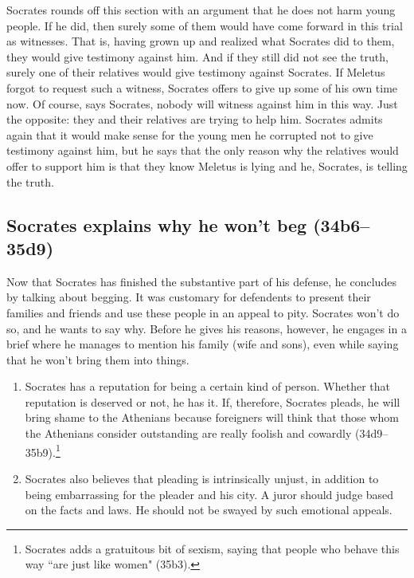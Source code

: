 \documentclass[11pt]{article}
\begin{document}
Socrates rounds off this section with an argument that he does not harm
young people.  If he did, then surely some of them would have come forward
in this trial as witnesses.  That is, having grown up and realized what
Socrates did to them, they would give testimony against him.  And if they
still did not see the truth, surely one of their relatives would give
testimony against Socrates.  If Meletus forgot to request such a witness,
Socrates offers to give up some of his own time now.  Of course, says
Socrates, nobody will witness against him in this way.  Just the opposite:
they and their relatives are trying to help him.  Socrates admits again
that it would make sense for the young men he corrupted not to give
testimony against him, but he says that the only reason why the relatives
would offer to support him is that they know Meletus is lying and he,
Socrates, is telling the truth.


\subsection{Socrates explains why he won't beg (34b6--35d9)}

Now that Socrates has finished the substantive part of his defense, he
concludes by talking about begging.  It was customary for defendents to
present their families and friends and use these people in an appeal to
pity.  Socrates won't do so, and he wants to say why.  Before he gives his
reasons, however, he engages in a brief  where he
manages to mention his family (wife and sons), even while saying that he
won't bring them into things.

\begin{enumerate}

    \item Socrates has a reputation for being a certain kind of person.
        Whether that reputation is deserved or not, he has it. If,
        therefore, Socrates pleads, he will bring shame to the Athenians
        because foreigners will think that those whom the Athenians
        consider outstanding are really foolish and cowardly
        (34d9--35b9).\footnote{Socrates adds a gratuitous bit of sexism,
        saying that people who behave this way ``are just like women"
        (35b3).}

    \item Socrates also believes that pleading is intrinsically unjust, in
        addition to being embarrassing for the pleader and his city.
        A juror should judge based on the facts and laws.  He should not be
        swayed by such emotional appeals.

\end{enumerate}
\end{document}
